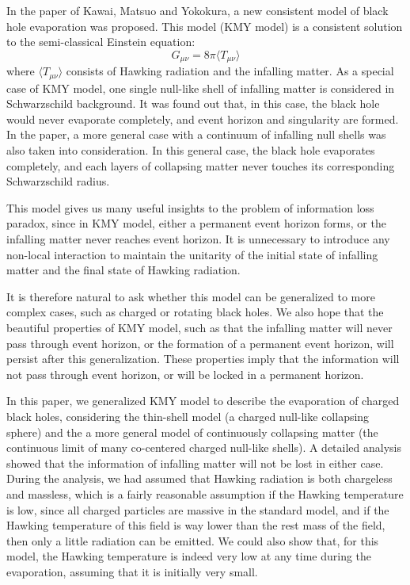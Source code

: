 \documentclass[letterpaper,12pt]{article}
\begin{document}
In the paper of Kawai, Matsuo and Yokokura, a new consistent model of black hole evaporation was proposed.\cite{kawai2013self,kawai2016interior,kawai2017model} This model (KMY model) is a consistent solution to the semi-classical Einstein equation:
\begin{equation}
G_{\mu\nu} = 8\pi \langle T_{\mu\nu}\rangle
\end{equation}
where $\langle T_{\mu\nu}\rangle $ consists of Hawking radiation and the infalling matter. As a special case of KMY model, one single null-like shell of infalling matter is considered in Schwarzschild background.\cite{kawai2013self} It was found out that, in this case, the black hole would never evaporate completely, and event horizon and singularity are formed. In the paper, a more general case with a continuum of infalling null shells was also taken into consideration.\cite{kawai2013self} In this general case, the black hole evaporates completely, and each layers of collapsing matter never touches its corresponding Schwarzschild radius.

This model gives us many useful insights to the problem of information loss paradox\cite{ho2015comment, ho2016absence}, since in KMY model, either a permanent event horizon forms, or the infalling matter never reaches event horizon. It is  unnecessary to introduce any non-local interaction to maintain the unitarity of the initial state of infalling matter and the final state of Hawking radiation.

It is therefore natural to ask whether this model can be generalized to more complex cases, such as charged or rotating black holes. We also hope that the beautiful properties of KMY model, such as that the infalling matter will never pass through event horizon, or the formation of a permanent event horizon, will persist after this generalization. These properties imply that the information will not pass through event horizon, or will be locked in a permanent horizon.

In this paper, we generalized KMY model to describe the evaporation of charged black holes, considering the thin-shell model (a charged null-like collapsing sphere) and the a more general model of continuously collapsing matter (the continuous limit of many co-centered charged null-like shells). A detailed analysis showed that the information of infalling matter will not be lost in either case. During the analysis, we had assumed that Hawking radiation is both chargeless and massless, which is a fairly reasonable assumption if the Hawking temperature is low, since all charged particles are massive in the standard model, and if the Hawking temperature of this field is way lower than the rest mass of the field, then only a little radiation can be emitted. We could also show that, for this model, the Hawking temperature is indeed very low at any time during the evaporation, assuming that it is initially very small.
\end{document}
